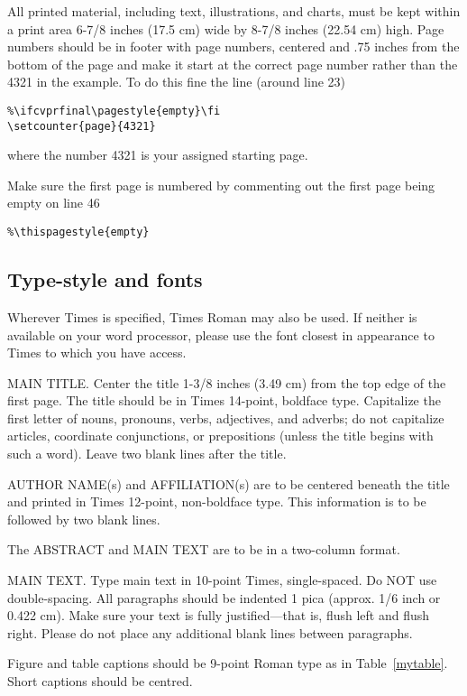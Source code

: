 \documentclass[10pt,twocolumn,letterpaper]{article}
\begin{document}
All printed material, including text, illustrations, and charts, must be kept
within a print area 6-7/8 inches (17.5 cm) wide by 8-7/8 inches (22.54 cm)
high.
Page numbers should be in footer with page numbers, centered and .75
inches from the bottom of the page and make it start at the correct page
number rather than the 4321 in the example.  To do this fine the line (around
line 23)
\begin{verbatim}
%\ifcvprfinal\pagestyle{empty}\fi
\setcounter{page}{4321}
\end{verbatim}
where the number 4321 is your assigned starting page.

Make sure the first page is numbered by commenting out the first page being
empty on line 46
\begin{verbatim}
%\thispagestyle{empty}
\end{verbatim}


\subsection{Type-style and fonts}

Wherever Times is specified, Times Roman may also be used. If neither is
available on your word processor, please use the font closest in
appearance to Times to which you have access.

MAIN TITLE. Center the title 1-3/8 inches (3.49 cm) from the top edge of
the first page. The title should be in Times 14-point, boldface type.
Capitalize the first letter of nouns, pronouns, verbs, adjectives, and
adverbs; do not capitalize articles, coordinate conjunctions, or
prepositions (unless the title begins with such a word). Leave two blank
lines after the title.

AUTHOR NAME(s) and AFFILIATION(s) are to be centered beneath the title
and printed in Times 12-point, non-boldface type. This information is to
be followed by two blank lines.

The ABSTRACT and MAIN TEXT are to be in a two-column format.

MAIN TEXT. Type main text in 10-point Times, single-spaced. Do NOT use
double-spacing. All paragraphs should be indented 1 pica (approx. 1/6
inch or 0.422 cm). Make sure your text is fully justified---that is,
flush left and flush right. Please do not place any additional blank
lines between paragraphs.

Figure and table captions should be 9-point Roman type as in
Table~\ref{mytable}. Short captions should be centred.
\end{document}
